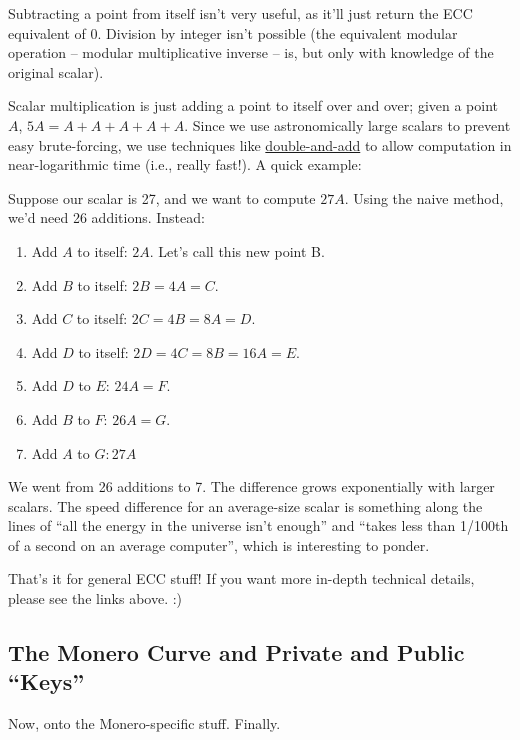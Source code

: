 Subtracting a point from itself isn't very useful, as it'll just return the ECC equivalent of 0. Division by integer isn't possible (the equivalent modular operation -- modular multiplicative inverse -- is, but only with knowledge of the original scalar).

Scalar multiplication is just adding a point to itself over and over; given a point \(A\), \(5A = A + A + A + A + A\). Since we use astronomically large scalars to prevent easy brute-forcing, we use techniques like \href{https://en.wikipedia.org/wiki/Elliptic_curve_point_multiplication#Double-and-add}{double-and-add} to allow computation in near-logarithmic time (i.e., really fast!). A quick example:

Suppose our scalar is 27, and we want to compute \(27A\). Using the naive method, we'd need 26 additions. Instead:
	\begin{enumerate}
		\item Add \(A\) to itself: \(2A\). Let's call this new point B.
		\item Add \(B\) to itself: \(2B = 4A = C\).
		\item Add \(C\) to itself: \(2C = 4B = 8A = D\).
		\item Add \(D\) to itself: \(2D = 4C = 8B = 16A = E\).
		\item Add \(D\) to \(E\): \(24A = F\).
		\item Add \(B\) to \(F\): \(26A = G\).
		\item Add \(A\) to \(G: 27A\)
	\end{enumerate}

We went from 26 additions to 7. The difference grows exponentially with larger scalars. The speed difference for an average-size scalar is something along the lines of ``all the energy in the universe isn't enough'' and ``takes less than 1/100th of a second on an average computer'', which is interesting to ponder.

That's it for general ECC stuff! If you want more in-depth technical details, please see the links above. :)

\subsection{The Monero Curve and Private and Public ``Keys''}
Now, onto the Monero-specific stuff. Finally.

